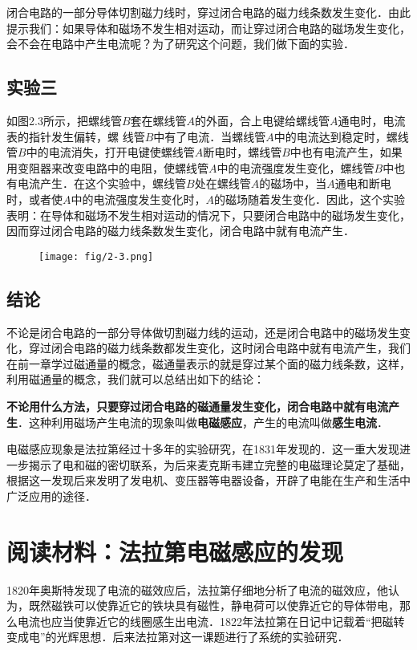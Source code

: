 闭合电路的一部分导体切割磁力线时，穿过闭合电路的磁力线条数发生变化．由此提示我们：如果导体和磁场不发生相对运动，而让穿过闭合电路的磁场发生变化，会不会在电路中产生电流呢？为了研究这个问题，我们做下面的实验．

\subsection*{实验三}

如图2.3所示，把螺线管$B$套在螺线管$A$的外面，合上电键给螺线管$A$通电时，电流表的指针发生偏转，螺
线管$B$中有了电流．当螺线管$A$中的电流达到稳定时，螺线管$B$中的电流消失，打开电键使螺线管$A$断电时，螺线管$B$中也有电流产生，如果用变阻器来改变电路中的电阻，使螺线管$A$中的电流强度发生变化，螺线管$B$中也有电流产生．在这个实验中，螺线管$B$处在螺线管$A$的磁场中，当$A$通电和断电时，或者使$A$中的电流强度发生变化时，$A$的磁场随着发生变化．因此，这个实验表明：在导体和磁场不发生相对运动的情况下，只要闭合电路中的磁场发生变化，因而穿过闭合电路的磁力线条数发生变化，闭合电路中就有电流产生．
\begin{figure}[htp]\centering
\texttt{[image: fig/2-3.png]}
\caption{}
\end{figure}

\subsection*{结论}


不论是闭合电路的一部分导体做切割磁力线的运动，还是闭合电路中的磁场发生变化，穿过闭合电路的磁力线条数都发生变化，这时闭合电路中就有电流产生，我们在前一章学过磁通量的概念，磁通量表示的就是穿过某个面的磁力线条数，这样，利用磁通量的概念，我们就可以总结出如下的结论：

\textbf{不论用什么方法，只要穿过闭合电路的磁通量发生变化，闭合电路中就有电流产生}．这种利用磁场产生电流的现象叫做\textbf{电磁感应}，产生的电流叫做\textbf{感生电流}．

电磁感应现象是法拉第经过十多年的实验研究，在1831年发现的．这一重大发现进一步揭示了电和磁的密切联系，为后来麦克斯韦建立完整的电磁理论莫定了基础，根据这一发现后来发明了发电机、变压器等电器设备，开辟了电能在生产和生活中广泛应用的途径．

\section*{阅读材料：法拉第电磁感应的发现}

1820年奥斯特发现了电流的磁效应后，法拉第仔细地分析了电流的磁效应，他认为，既然磁铁可以使靠近它的铁块具有磁性，静电荷可以使靠近它的导体带电，那么电流也应当使靠近它的线圈感生出电流．1822年法拉第在日记中记载着“把磁转变成电”的光辉思想．后来法拉第对这一课题进行了系统的实验研究．


